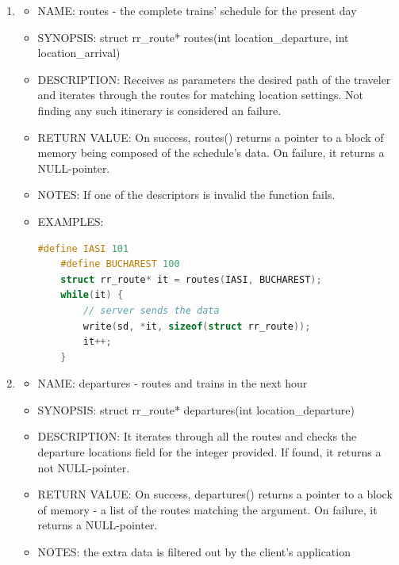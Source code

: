\documentclass[runningheads]{llncs}
\begin{document}
\begin{enumerate}
   \item \begin{itemize} \item NAME: routes - the complete trains' schedule for the present day
            \item SYNOPSIS: struct rr\_route* routes(int location\_departure, int location\_arrival)  
            \item DESCRIPTION: Receives as parameters the desired path of the traveler and iterates through the routes for matching location settings. Not finding any such itinerary is considered an failure.
            \item RETURN VALUE: On success, routes() returns a pointer to a block of memory being composed of the schedule's data. On failure, it returns a NULL-pointer.
            \item NOTES: If one of the descriptors is invalid the function fails. 
            \item EXAMPLES: \begin{lstlisting}[language=C++]
    #define IASI 101
    #define BUCHAREST 100
    struct rr_route* it = routes(IASI, BUCHAREST);
    while(it) {
        // server sends the data 
        write(sd, *it, sizeof(struct rr_route));
        it++; 
    }
            \end{lstlisting}
            \vspace{0.3cm}
   \end{itemize}
   
   \item \begin{itemize} \item NAME: departures - routes and trains in the next hour
            \item SYNOPSIS: struct rr\_route* departures(int location\_departure)  
            \item DESCRIPTION: It iterates through  all the routes and checks the departure locations field for the integer provided. If found, it returns a not NULL-pointer. 
            \item RETURN VALUE: On success, departures() returns a pointer to a block of memory - a list of the routes matching the argument. On failure, it returns a NULL-pointer.
            \item NOTES: the extra data is filtered out by the client's application
            \vspace{0.3cm}
   \end{itemize}
   

\end{enumerate}
\end{document}
